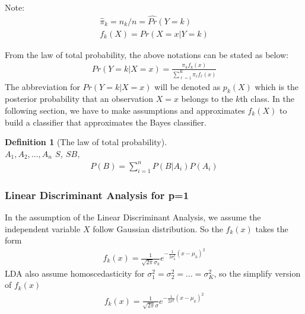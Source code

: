     \documentclass[12pt,fleqn,a4paper]{article}%
\newtheorem{definition}{Definition}
\theoremstyle{definition}
\theoremstyle{plain}
\numberwithin{equation}{section}
\begin{document}
\begin{framed}
Note:
\begin{gather*}
\hat{\pi}_{k} = n_{k}/n = \hat{Pr}(Y=k) \\
f_{k}(X) = Pr(X=x|Y=k)
\end{gather*}
\end{framed}
From the law of total probability, the above notations can be stated as below:
\begin{gather}
Pr(Y=k|X=x) = \frac{\pi_{k}f_{k}(x)}{\sum\limits_{\ell=1}^{K}\pi_{\ell}f_{\ell}(x)}
\label{lda}
\end{gather}
The abbreviation for $Pr(Y=k|X=x)$ will be denoted as $p_{k}(X)$ which is the posterior probability that an observation $X=x$ belongs to the $k$th class.
In the following section, we have to make assumptions and approximates $f_{k}(X)$ to build a classifier that approximates the Bayes classifier.

\begin{framed}
\begin{definition}[The law of total probability]
~\\
{\McQ{}} $A_{1},A_{2},\dots,A_{n}$ {\MbQ{}}$S${\MaQ{}}, {\MaQ{}}$S${\MaQ{}}$B${\McQ{}},
\begin{gather*}
P(B) = \sum\limits_{i=1}^{n}P(B|A_{i})P(A_{i})
\end{gather*}

\end{definition}
\end{framed}

\subsubsection{\textbf{Linear Discriminant Analysis for p=1}}
In the assumption of the Linear Discriminant Analysis, we assume the independent variable $X$ follow Gaussian distribution.
So the $f_{k}(x)$ takes the form
\begin{gather}
f_{k}(x) = \frac{1}{\sqrt{2\pi}\sigma_{k}}e^{-\frac{1}{2\sigma_{k}^{2}}(x-\mu_{k})^{2}}
\end{gather}
LDA also assume homoscedasticity for $\sigma_{1}^{2}=\sigma_{2}^{2}=\dots=\sigma_{K}^{2}$, so the simplify version of $f_{k}(x)$
\begin{gather}
f_{k}(x) = \frac{1}{\sqrt{2\pi}\sigma}e^{-\frac{1}{2\sigma^{2}}(x-\mu_{k})^{2}}
\label{lda_normal}
\end{gather}
\end{document}
